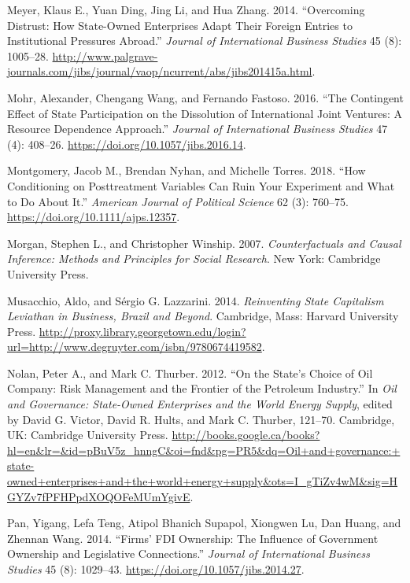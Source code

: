 \documentclass[11pt,]{book}
\begin{document}
\leavevmode\hypertarget{ref-meyer_overcoming_2014}{}%
Meyer, Klaus E., Yuan Ding, Jing Li, and Hua Zhang. 2014. ``Overcoming Distrust: How State-Owned Enterprises Adapt Their Foreign Entries to Institutional Pressures Abroad.'' \emph{Journal of International Business Studies} 45 (8): 1005--28. \url{http://www.palgrave-journals.com/jibs/journal/vaop/ncurrent/abs/jibs201415a.html}.

\leavevmode\hypertarget{ref-mohr_contingent_2016}{}%
Mohr, Alexander, Chengang Wang, and Fernando Fastoso. 2016. ``The Contingent Effect of State Participation on the Dissolution of International Joint Ventures: A Resource Dependence Approach.'' \emph{Journal of International Business Studies} 47 (4): 408--26. \url{https://doi.org/10.1057/jibs.2016.14}.

\leavevmode\hypertarget{ref-montgomery_how_2018}{}%
Montgomery, Jacob M., Brendan Nyhan, and Michelle Torres. 2018. ``How Conditioning on Posttreatment Variables Can Ruin Your Experiment and What to Do About It.'' \emph{American Journal of Political Science} 62 (3): 760--75. \url{https://doi.org/10.1111/ajps.12357}.

\leavevmode\hypertarget{ref-morgan_counterfactuals_2007}{}%
Morgan, Stephen L., and Christopher Winship. 2007. \emph{Counterfactuals and Causal Inference: Methods and Principles for Social Research}. New York: Cambridge University Press.

\leavevmode\hypertarget{ref-musacchio_reinventing_2014}{}%
Musacchio, Aldo, and Sérgio G. Lazzarini. 2014. \emph{Reinventing State Capitalism Leviathan in Business, Brazil and Beyond}. Cambridge, Mass: Harvard University Press. \url{http://proxy.library.georgetown.edu/login?url=http://www.degruyter.com/isbn/9780674419582}.

\leavevmode\hypertarget{ref-victor_states_2012}{}%
Nolan, Peter A., and Mark C. Thurber. 2012. ``On the State's Choice of Oil Company: Risk Management and the Frontier of the Petroleum Industry.'' In \emph{Oil and Governance: State-Owned Enterprises and the World Energy Supply}, edited by David G. Victor, David R. Hults, and Mark C. Thurber, 121--70. Cambridge, UK: Cambridge University Press. \url{http://books.google.ca/books?hl=en\&lr=\&id=pBuV5z_hnngC\&oi=fnd\&pg=PR5\&dq=Oil+and+governance:+state-owned+enterprises+and+the+world+energy+supply\&ots=I_gTiZv4wM\&sig=HGYZv7fPFHPpdXOQOFeMUmYgivE}.

\leavevmode\hypertarget{ref-pan_firms_2014}{}%
Pan, Yigang, Lefa Teng, Atipol Bhanich Supapol, Xiongwen Lu, Dan Huang, and Zhennan Wang. 2014. ``Firms' FDI Ownership: The Influence of Government Ownership and Legislative Connections.'' \emph{Journal of International Business Studies} 45 (8): 1029--43. \url{https://doi.org/10.1057/jibs.2014.27}.
\end{document}
